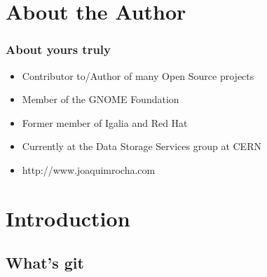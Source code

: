 
\section{About the Author}

\begin{frame}
  \frametitle{About yours truly}

  \begin{itemize}
    \item Contributor to/Author of many Open Source projects
    \item Member of the GNOME Foundation
    \item Former member of Igalia and Red Hat
    \item Currently at the Data Storage Services group at CERN
    \item http://www.joaquimrocha.com
  \end{itemize}
\end{frame}


\section{Introduction}


\subsection{What's git}

